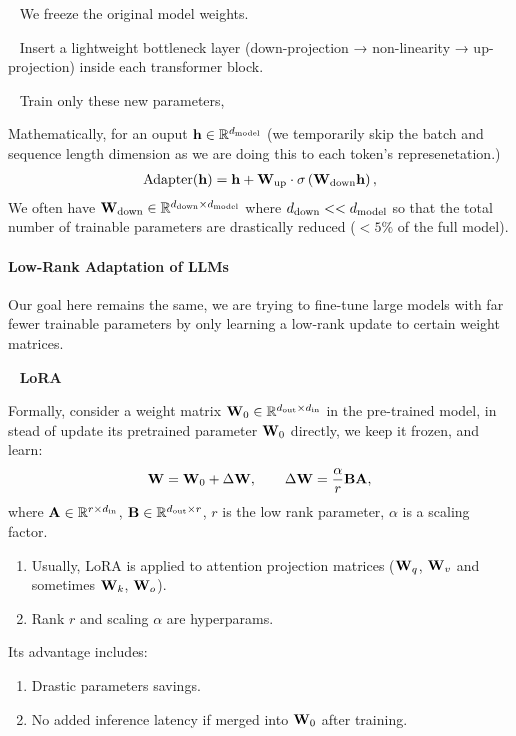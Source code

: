 \documentclass[11pt]{article}  %
\begin{document}
\textbullet~ We freeze the original model weights.

\textbullet~ Insert a lightweight bottleneck layer (down-projection → non-linearity → up-projection) inside each transformer block.

\textbullet~ Train only these new parameters,

Mathematically, for an ouput $\mathbf{h} \in \mathbb{R}^{d_{\text{model}}}$ (we temporarily skip the batch and sequence length dimension as we are doing this to each token's represenetation.)
\begin{align*}
  \text{Adapter}(\mathbf{h}) = \mathbf{h} + \mathbf{W}_{\text{up}} \cdot \sigma\left( \mathbf{W}_{\text{down}}\mathbf{h} \right), 
\end{align*}
We often have $\mathbf{W}_{\text{down}} \in \mathbb{R}^{d_{\text{down}} \times d_{\text{model}}}$ where $d_{\text{down}} << d_{\text{model}}$ so that the total number of trainable parameters are drastically reduced ($<5\%$ of the full model).


\paragraph{Low-Rank Adaptation of LLMs} Our goal here remains the same, we are trying to fine-tune large models with far fewer trainable parameters by only learning a low-rank update to certain weight matrices.

\textbullet~ \textbf{LoRA}

Formally, consider a weight matrix $\mathbf{W}_0 \in \mathbb{R}^{d_{\text{out}} \times d_{\text{in}}}$ in the pre-trained model, in stead of update its pretrained parameter $\mathbf{W}_0$ directly, we keep it frozen, and learn: 
\begin{align*}
  \mathbf{W} = \mathbf{W}_0 + \Delta \mathbf{W}, \qquad \Delta \mathbf{W} = \frac{\alpha}{r}\mathbf{B}\mathbf{A},
\end{align*}
where $\mathbf{A} \in \mathbb{R}^{r \times d_{\text{in}}}$, $\mathbf{B} \in \mathbb{R}^{d_{\text{out}} \times r}$, $r$ is the low rank parameter, $\alpha$ is a scaling factor.

\begin{enumerate}
  \item Usually, LoRA is applied to attention projection matrices ($\mathbf{W}_q$, $\mathbf{W}_v$ and sometimes $\mathbf{W}_k$, $\mathbf{W}_o$).
  \item Rank $r$ and scaling $\alpha$ are hyperparams.
\end{enumerate}

Its advantage includes: 
\begin{enumerate}
  \item Drastic parameters savings.
  \item No added inference latency if merged into $\mathbf{W}_0$ after training.
\end{enumerate}
\end{document}
